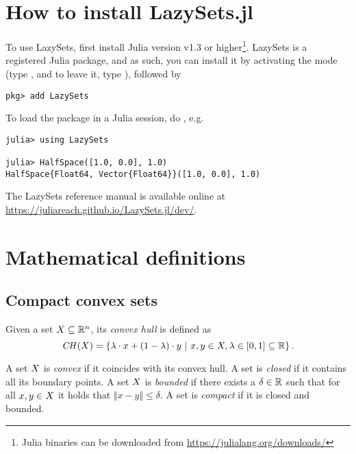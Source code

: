 \appendix
\section{How to install LazySets.jl}\label{sec:installation}

To use LazySets, first install Julia version v1.3 or higher\footnote{Julia binaries can be downloaded from \href{the official website}{https://julialang.org/downloads/}}. LazySets is a registered Julia package, and as such, you can install it by activating the  mode (type \code{]}, and to leave it, type ),
followed by

\begin{minipage}{\linewidth}
\vspace{-\abovedisplayskip}
\begin{lstlisting}
pkg> add LazySets
\end{lstlisting}
\end{minipage}
To load the package in a Julia session, do , e.g.

\begin{minipage}{\linewidth}
	\vspace{-\abovedisplayskip}
	\begin{lstlisting}
julia> using LazySets

julia> HalfSpace([1.0, 0.0], 1.0)
HalfSpace{Float64, Vector{Float64}}([1.0, 0.0], 1.0)
	\end{lstlisting}
\end{minipage}

The LazySets reference manual is available online at
\href{https://juliareach.github.io/LazySets.jl/dev/}{https://juliareach.github.io/LazySets.jl/dev/}.

\section{Mathematical definitions}\label{sec:mathdef}

\subsection{Compact convex sets}\label{sec:convexdef}

Given a set $X \subseteq \mathbb{R}^n$, its \emph{convex hull} is defined as
%
\[
	\mathit{CH}(X) = \left\{ \lambda \cdot x + (1 - \lambda) \cdot y ~\middle|~ x, y \in X, \lambda \in [0, 1] \subseteq \mathbb{R} \right\}.
\]

A set $X$ is \emph{convex} if it coincides with its convex hull.
%
A set is \emph{closed} if it contains all its boundary points.
%
A set $X$ is \emph{bounded} if there exists a $\delta \in \mathbb{R}$ such that for all $x, y \in X$ it holds that $\Vert x - y \Vert \leq \delta$.
%
A set is \emph{compact} if it is closed and bounded.

